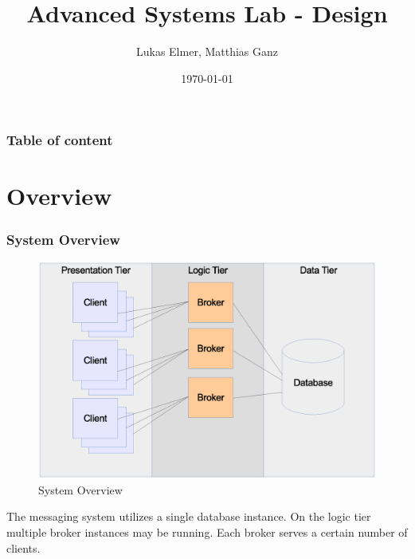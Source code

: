 \documentclass{beamer}
\title{Advanced Systems Lab - Design}
\author{Lukas Elmer, Matthias Ganz}
\date{\today}
\begin{document}
\begin{frame}
\titlepage
\end{frame} 

\begin{frame}
\frametitle{Table of content}
\tableofcontents
\end{frame} 



\section{Overview}
\begin{frame}
\frametitle{System Overview}

\begin{figure}
  \begin{center}
    \includegraphics[scale=0.2]{../../drawings/system-overview.eps}
  \end{center}
  \caption{System Overview}
  \label{fig:system-overview}
\end{figure}

The messaging system utilizes a single database instance. On the logic tier multiple broker instances may be running. Each broker serves a certain number of clients.


\end{frame}
\end{document}
